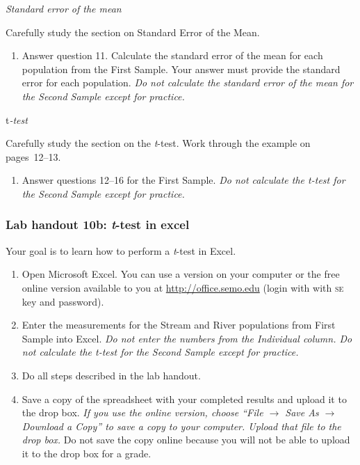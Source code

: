 \documentclass[12pt]{exam}
\begin{document}
\bigskip

\emph{Standard error of the mean}

Carefully study the section on Standard Error of the Mean. 

\begin{enumerate}[resume]
\item Answer question 11. Calculate the standard error of the mean for each population from the First Sample. Your answer must provide the standard error for each population. \emph{Do not calculate the standard error of the mean for the Second Sample except for practice.}

\end{enumerate}

\bigskip

t\emph{-test}

Carefully study the section on the \emph{t}-test. Work through the example on pages~12–13.


\begin{enumerate}[resume]
\item Answer questions 12–16 for the First Sample. \emph{Do not calculate the \emph{t}-test for the Second Sample except for practice.}
\end{enumerate}


\subsubsection*{Lab handout 10b: \emph{t}-test in excel}

Your goal is to learn how to perform a \emph{t}-test in Excel. 

\begin{enumerate}
\item Open Microsoft Excel. You can use a version on your computer or the free online version available to you at \url{http://office.semo.edu} (login with with \textsc{se} key and password).

\item Enter the measurements for the Stream and River populations from First Sample into Excel.  \emph{Do not enter the numbers from the Individual column. Do not calculate the \emph{t}-test for the Second Sample except for practice.}

\item Do all steps described in the lab handout.

\item Save a copy of the spreadsheet with your completed results and upload it to the drop box. \emph{If you use the online version, choose ``File $\rightarrow$ Save As $\rightarrow$ Download a Copy” to save a copy to your computer. Upload that file to the drop box.}  Do not save the copy online because you will not be able to upload it to the drop box for a grade.

\end{enumerate}
\end{document}
